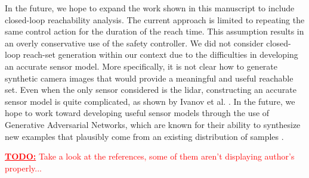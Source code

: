 \documentclass[manuscript,screen,review]{acmart}
\newcommand{\todo}[1]{\textcolor{red}{\textbf{\underline{TODO:}} #1}}
\begin{document}
In the future, we hope to expand the work shown in this manuscript to include closed-loop reachability analysis. The current approach is limited to repeating the same control action for the duration of the reach time. This assumption results in an overly conservative use of the safety controller.%
We did not consider closed-loop reach-set generation within our context due to the difficulties in developing an accurate sensor model. More specifically, it is not clear how to generate synthetic camera images that would provide a meaningful and useful reachable set. Even when the only sensor considered is the lidar, constructing an accurate sensor model is quite complicated, as shown by Ivanov et al. \cite{ivanov2020case}. In the future, we hope to work toward developing useful sensor models through the use of Generative Adversarial Networks, which are known for their ability to synthesize new examples that plausibly come from an existing distribution of samples \cite{Radford2016,Brock2018,goodfellow2014}.

\todo{Take a look at the references, some of them aren't displaying author's properly...}





\appendix
\end{document}
